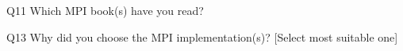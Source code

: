 \begin{description}%
\item{Q11} Which MPI book(s) have you read?%
\item{Q13} Why did you choose the MPI implementation(s)? [Select most suitable one]%
\end{description}%
